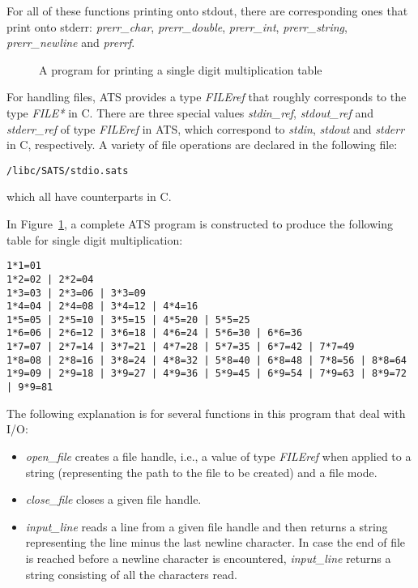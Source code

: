 For all of these functions printing onto stdout, there are corresponding
ones that print onto stderr: {\it prerr\_char}, {\it prerr\_double}, {\it
prerr\_int}, {\it prerr\_string}, {\it prerr\_newline} and {\it prerrf}.

\begin{figure}[thp]

\caption{A program for printing a single digit multiplication table}
\label{figure:multiplication_table_program}
\end{figure}
For handling files, ATS provides a type {\it FILEref} that roughly
corresponds to the type {\it FILE*} in C. There are three special values
{\it stdin\_ref}, {\it stdout\_ref} and {\it stderr\_ref} of type {\it
FILEref} in ATS, which correspond to {\it stdin}, {\it stdout} and {\it
stderr} in C, respectively. A variety of file operations are declared in
the following file:
\begin{center}
\texttt{\ATSHOME/libc/SATS/stdio.sats}
\end{center}
which all have counterparts in C.

In Figure~\ref{figure:multiplication_table_program}, a complete ATS program
is constructed to produce the following table for single digit multiplication:
\begin{verbatim}
1*1=01
1*2=02 | 2*2=04
1*3=03 | 2*3=06 | 3*3=09
1*4=04 | 2*4=08 | 3*4=12 | 4*4=16
1*5=05 | 2*5=10 | 3*5=15 | 4*5=20 | 5*5=25
1*6=06 | 2*6=12 | 3*6=18 | 4*6=24 | 5*6=30 | 6*6=36
1*7=07 | 2*7=14 | 3*7=21 | 4*7=28 | 5*7=35 | 6*7=42 | 7*7=49
1*8=08 | 2*8=16 | 3*8=24 | 4*8=32 | 5*8=40 | 6*8=48 | 7*8=56 | 8*8=64
1*9=09 | 2*9=18 | 3*9=27 | 4*9=36 | 5*9=45 | 6*9=54 | 7*9=63 | 8*9=72 | 9*9=81
\end{verbatim}
The following explanation is for several functions in this program that
deal with I/O:
\begin{itemize}
\item {\it open\_file}
creates a file handle, i.e., a value of type {\it FILEref} when applied to
a string (representing the path to the file to be created) and a file mode.
\item {\it close\_file}
closes a given file handle.
\item {\it input\_line} reads a line from a given file handle and then
returns a string representing the line minus the last newline character.
In case the end of file is reached before a newline character is
encountered, {\it input\_line} returns a string consisting of all the
characters read.
\end{itemize}

